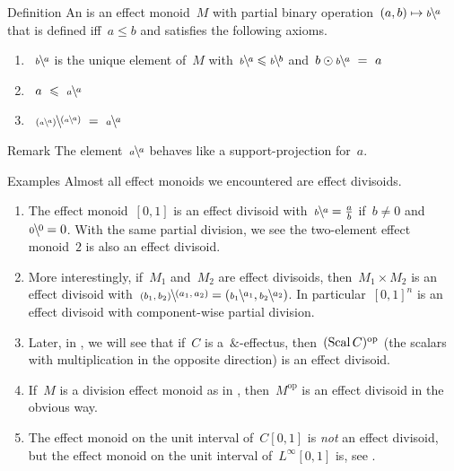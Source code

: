 \documentclass[b]{subfiles}
\begin{document}
\begin{parsec}%
\begin{point}{Definition}%
An 
    is an effect monoid~$M$
    with partial binary operation~$(a,b) \mapsto \rfrac{a}{b}$
    that is defined iff~$a \leq b$ and
        satisfies the following axioms.
\begin{enumerate}
\item~$\rfrac{a}{b}$
        is the unique element of~$M$
        with~$\rfrac{a}{b} \leq \rfrac{b}{b}$
        and~$b\odot \rfrac{a}{b} \ =\  a$
\item~$a \ \leq \ \rfrac{a}{a}$
\item~$\rfrac{(\rfrac{a}{a})}{(\rfrac{a}{a})} \ =\  \rfrac{a}{a}$
\end{enumerate}
\begin{point}{Remark}%
The element~$\rfrac{a}{a}$ behaves like a support-projection for~$a$.
\end{point}
\end{point}
\begin{point}{Examples}%
Almost all effect monoids we encountered
    are effect divisoids.
\begin{enumerate}
\item
The effect monoid~$[0,1]$
    is an effect divisoid with~$\rfrac{a}{b} = \frac{a}{b}$
        if~$b \neq 0$ and~$\rfrac{0}{0}=0$.
With the same partial division, we see the two-element effect monoid~$2$
    is also an effect divisoid.
\item
More interestingly,
    if~$M_1$ and~$M_2$
    are effect divisoids,
    then~$M_1 \times M_2$
    is an effect divisoid
    with~$\rfrac{(a_1,a_2)}{(b_1,b_2)} =
    (\rfrac{a_1}{b_1}, \rfrac{a_2}{b_2})$.
In particular~$[0,1]^n$ is an effect divisoid
    with component-wise partial division.
\item
Later, in ,
    we will see that if~$C$ is a~$\&$-effectus,
then~$(\operatorname{Scal} C)^{\mathrm{op}}$ (the scalars with multiplication in the
    opposite direction)
    is an effect divisoid.
\item
If~$M$ is a division effect monoid as in \cite[Dfn.~6.3]{kentapartial},
then~$M^{\textrm{op}}$ is an effect divisoid in the obvious way.
\item
The effect monoid on the unit interval of~$C[0,1]$
    is \emph{not} an effect divisoid,
    but the effect monoid on the unit interval of~$L^\infty[0,1]$
    is, see .
\end{enumerate}

\end{point}
\end{parsec}
\end{document}
